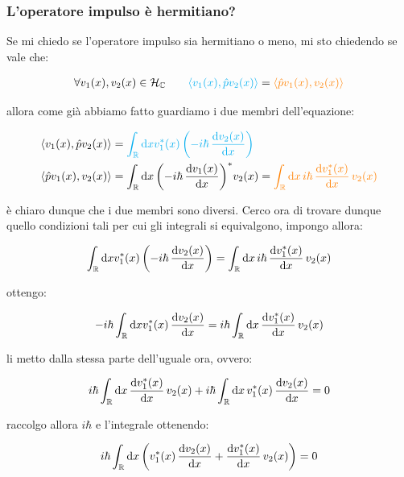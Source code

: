 \subsubsection{L'operatore impulso è hermitiano?}
	
	Se mi chiedo se l'operatore impulso sia hermitiano o meno, mi sto chiedendo se vale che:
	
\begin{align*}
	\forall v_1(x), v_2(x) \in \mathcal{H}_{\mathbb{C}} \qquad \textcolor{cyan}{\langle v_1(x), \hat{p}v_2(x) \rangle } = \textcolor{orange}{ \langle \hat{p}v_1(x), v_2(x) \rangle}
\end{align*}
	
	allora come già abbiamo fatto guardiamo i due membri dell'equazione:
	
\begin{align*}
	& \langle v_1(x), \hat{p}v_2(x) \rangle = \textcolor{cyan}{\int_{\mathbb{R}} \dd x v^*_1(x) \, \qty(-i\hbar \, \dv{v_2(x)}{x})} \\
	& \langle \hat{p}v_1(x), v_2(x) \rangle =  \int_{\mathbb{R}} \dd x \, \qty(-i\hbar \, \dv{v_1(x)}{x})^*  v_2(x) = \textcolor{orange}{  \int_{\mathbb{R}} \dd x \, i\hbar \, \dv{v^*_1(x)}{x} \, v_2(x)}
\end{align*}

	è chiaro dunque che i due membri sono diversi. Cerco ora di trovare dunque quello condizioni tali per cui gli integrali si equivalgono, impongo allora:
	
\begin{align*}
	\int_{\mathbb{R}} \dd x v^*_1(x) \, \qty(-i\hbar \, \dv{v_2(x)}{x})= \int_{\mathbb{R}} \dd x \, i\hbar \, \dv{v^*_1(x)}{x} \, v_2(x)
\end{align*}

	ottengo:
	
\begin{align*}
	-i\hbar \int_{\mathbb{R}} \dd x v^*_1(x) \, \dv{v_2(x)}{x}=  i\hbar  \int_{\mathbb{R}} \dd x \, \dv{v^*_1(x)}{x} \, v_2(x)
\end{align*}

	li metto dalla stessa parte dell'uguale ora, ovvero:
	
\begin{align*}
 	i\hbar  \int_{\mathbb{R}} \dd x \, \dv{v^*_1(x)}{x} \, v_2(x) + i\hbar \int_{\mathbb{R}} \dd x \, v^*_1(x) \, \dv{v_2(x)}{x} = 0
\end{align*}
	
	raccolgo allora $i\hbar$ e l'integrale ottenendo:

\begin{align*}
	i\hbar  \int_{\mathbb{R}} \dd x \, \qty( v^*_1(x) \, \dv{v_2(x)}{x}   +    \dv{v^*_1(x)}{x} \, v_2(x) ) = 0
\end{align*}


